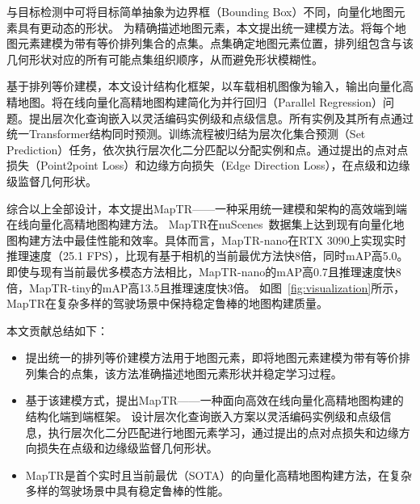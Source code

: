 \documentclass{article} %
\begin{document}
与目标检测中可将目标简单抽象为边界框（Bounding Box）不同，向量化地图元素具有更动态的形状。
为精确描述地图元素，本文提出统一建模方法。将每个地图元素建模为带有等价排列集合的点集。点集确定地图元素位置，排列组包含与该几何形状对应的所有可能点集组织顺序，从而避免形状模糊性。

基于排列等价建模，本文设计结构化框架，以车载相机图像为输入，输出向量化高精地图。将在线向量化高精地图构建简化为并行回归（Parallel Regression）问题。提出层次化查询嵌入以灵活编码实例级和点级信息。所有实例及其所有点通过统一Transformer结构同时预测。训练流程被归结为层次化集合预测（Set Prediction）任务，依次执行层次化二分匹配以分配实例和点。通过提出的点对点损失（Point2point Loss）和边缘方向损失（Edge Direction Loss），在点级和边缘级监督几何形状。

综合以上全部设计，本文提出MapTR——一种采用统一建模和架构的高效端到端在线向量化高精地图构建方法。
MapTR在nuScenes~\citep{nuscenes}数据集上达到现有向量化地图构建方法中最佳性能和效率。具体而言，MapTR-nano在RTX 3090上实现实时推理速度（25.1 FPS），比现有基于相机的当前最优方法快8倍，同时mAP高5.0。
即使与现有当前最优多模态方法相比，MapTR-nano的mAP高0.7且推理速度快8倍，MapTR-tiny的mAP高13.5且推理速度快3倍。
如图~\ref{fig:visualization}所示，MapTR在复杂多样的驾驶场景中保持稳定鲁棒的地图构建质量。

本文贡献总结如下：
\begin{itemize}
    \item 提出统一的排列等价建模方法用于地图元素，即将地图元素建模为带有等价排列集合的点集，该方法准确描述地图元素形状并稳定学习过程。
    \item 基于该建模方式，提出MapTR——一种面向高效在线向量化高精地图构建的结构化端到端框架。
    设计层次化查询嵌入方案以灵活编码实例级和点级信息，执行层次化二分匹配进行地图元素学习，通过提出的点对点损失和边缘方向损失在点级和边缘级监督几何形状。
    \item MapTR是首个实时且当前最优（SOTA）的向量化高精地图构建方法，在复杂多样的驾驶场景中具有稳定鲁棒的性能。
\end{itemize}
\end{document}
